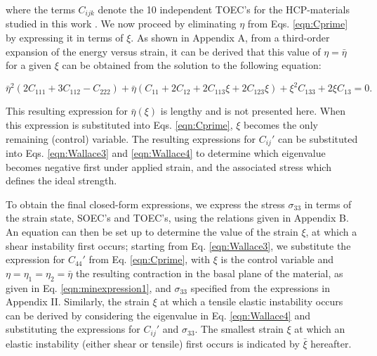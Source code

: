 \documentclass[showpacs,aps,floatfix,prb,reprint,superscriptaddress]{revtex4-1}
\begin{document}
where the terms $C_{ijk}$ denote the 10 independent TOEC's for the HCP-materials studied in this work \cite{hearmon1953third,rose1968higher,fumi1951third,fumi1952third}. We now proceed by eliminating $\eta$ from Eqs. \ref{eqn:Cprime} by expressing it in terms of $\xi$.  As shown in Appendix A, from a third-order expansion of the energy versus strain, it can be derived that this value of $\eta=\bar{\eta}$ for a given $\xi$ can be obtained from the solution to the following equation:
\begin{widetext}
\begin{equation}
\label{eqn:minexpression1}
\bar{\eta}^{2} \left(2C_{111} + 3C_{112} - C_{222} \right) + \bar{\eta} \left(C_{11} + 2C_{12} + 2C_{113} \xi + 2C_{123} \xi \right) + \xi^{2} C_{133} + 2\xi C_{13} = 0.
\end{equation}
\end{widetext} 
This resulting expression for $\bar{\eta}(\xi)$ is lengthy and is not presented here.  When this expression is substituted into Eqs. \ref{eqn:Cprime}, $\xi$ becomes the only remaining (control) variable. The resulting expressions for $C_{ij}'$ can be substituted into Eqs. \ref{eqn:Wallace3} and \ref{eqn:Wallace4} to determine which eigenvalue becomes negative first under applied strain, and the associated stress which defines the ideal strength.

To obtain the final closed-form expressions, we express the stress $\sigma_{33}$ in terms of the strain state, SOEC's and TOEC's, using the relations given in Appendix B.  An equation can then be set up to determine the value of the strain $\xi$, at which a shear instability first occurs; starting from Eq. \ref{eqn:Wallace3}, we substitute the expression for $C_{44}'$ from Eq. \ref{eqn:Cprime}, with $\xi$ is the control variable and $\eta = \eta_{1} = \eta_{2} = \bar{\eta}$ the resulting contraction in the basal plane of the material, as given in Eq. \ref{eqn:minexpression1}, and $\sigma_{33}$ specified from the expressions in Appendix II.  Similarly, the strain $\xi$ at which a tensile elastic instability occurs can be derived by considering the eigenvalue in Eq. \ref{eqn:Wallace4} and substituting the expressions for $C_{ij}'$ and $\sigma_{33}$. The smallest strain $\xi$ at which an elastic instability (either shear or tensile) first occurs is indicated by $\bar{\xi}$ hereafter.
\end{document}
